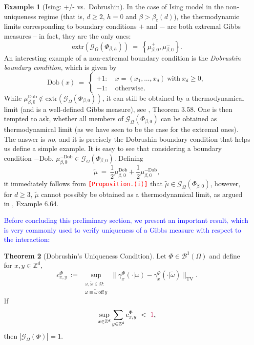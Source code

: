 \documentclass[12pt]{article}
\newcommand{\BB}{\mathscr{B}}
\newcommand{\G}{\mathcal{G}}
\newcommand{\Z}{\mathbb{Z}}
\newcommand{\TV}{\mathrm{TV}}
\newcommand{\set}[1]{\left\{#1\right\}}
\newcommand{\pika}{\boldsymbol{\cdot}}
\newcommand{\1}{\mathbbm{1}}
\newcommand{\5}{\vspace{0.5cm}}
\renewcommand{\tilde}{\widetilde}
\theoremstyle{definition}
\newtheorem{thm}{Theorem}[section]
\newtheorem{ex}[thm]{Example}
\begin{document}
\begin{ex}[Ising: +/- vs.~Dobrushin]
In the case of Ising model in the non-uniqueness regime (that is, $d\geq 2$, $h=0$ and $\beta>\beta_c(d)$), the thermodynamic limits corresponding to boundary conditions $+$ and $-$ are both extremal Gibbs measures -- in fact, they are the only ones:
$$\mathrm{extr}(\G_\Omega(\Phi_{\beta,h})) ~=~ \set{\mu_{\beta,0}^+,\mu_{\beta,0}^-}.$$
An interesting example of a non-extremal boundary condition is the \textit{Dobrushin boundary condition}, which is given by
$$\mathrm{Dob}(x) ~=~ \begin{cases}
+1: ~&x=(x_1,\ldots,x_d)~\text{with}~x_d\geq 0,\\
-1: ~&\text{otherwise}. 
\end{cases}$$
While $\mu_{\beta,0}^{\mathrm{Dob}}\notin\mathrm{extr}(\G_\Omega(\Phi_{\beta,0}))$, it can still be obtained by a thermodynamical limit (and is a well-defined Gibbs measure), see \cite{FV}, Theorem 3.58. One is then tempted to ask, whether all members of $\G_\Omega(\Phi_{\beta,0})$ can be obtained as thermodynamical limit (as we have seen to be the case for the extremal ones). The answer is \textit{no}, and it is precisely the Dobrushin boundary condition that helps us define a simple example. It is easy to see that considering a boundary condition $-\mathrm{Dob}$, $\mu_{\beta,0}^{-\mathrm{Dob}}\in\G_\Omega(\Phi_{\beta,0})$. Defining
$$\tilde{\mu} ~=~ \frac{1}{2}\mu_{\beta,0}^{\mathrm{Dob}} + \frac{1}{2}\mu_{\beta,0}^{-\mathrm{Dob}},$$
it immediately follows from \textcolor{red}{\texttt{[Proposition.(i)]}} that $\tilde{\mu}\in\G_{\Omega}(\Phi_{\beta,0})$, however, for $d\geq 3$, $\tilde{\mu}$ cannot possibly be obtained as a thermodynamical limit, as argued in \cite{FV}, Example 6.64.
\end{ex}

\textcolor{blue}{Before concluding this preliminary section, we present an important result, which is very commonly used to verify uniqueness of a Gibbs measure with respect to the interaction:}
\begin{thm}[Dobrushin's Uniqueness Condition]
Let $\Phi\in\BB^1(\Omega)$ and define for $x,y\in\Z^d$,
$$c_{x,y}^\Phi ~:=~ \sup_{\substack{\omega,\tilde{\omega}\in\Omega:\\\omega\equiv\tilde{\omega}~\text{off}~ y}}\|\gamma_x^\Phi(\pika|\omega)-\gamma_x^\Phi(\pika|\tilde{\omega})\|_\TV.$$
If
$$\sup_{x\in\Z^d}\sum_{y\in\Z^d}c_{x,y}^\Phi ~<~ \textcolor{purple}{1},$$
then $|\G_\Omega(\Phi)|=1$.
\end{thm}
\end{document}
